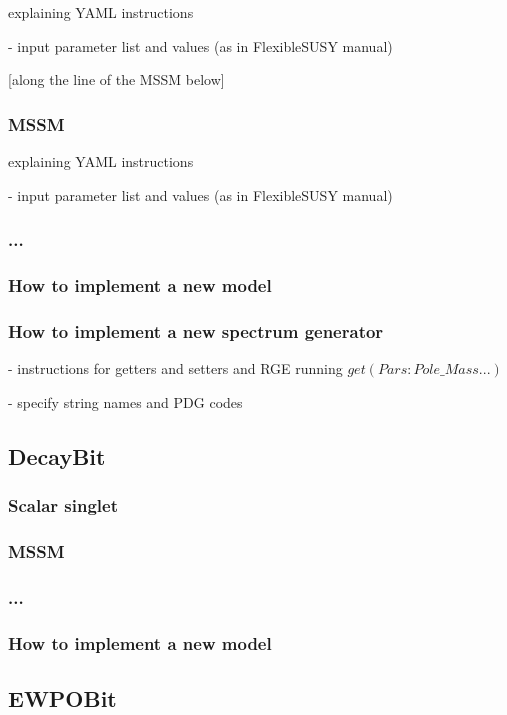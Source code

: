 \documentclass[11pt,a4paper]{article}
\begin{document}
explaining YAML instructions 

- input parameter list and values (as in FlexibleSUSY manual)

[along the line of the MSSM below]

\subsubsection{MSSM}

explaining YAML instructions 

- input parameter list and values (as in FlexibleSUSY manual)

\subsubsection{...}

\subsubsection{How to implement a new model}

\subsubsection{How to implement a new spectrum generator}

- instructions for getters and setters and RGE running
$get(Pars:Pole\_Mass...)$

- specify string names and PDG codes


\subsection{DecayBit}
\subsubsection{Scalar singlet}
\subsubsection{MSSM}
\subsubsection{...}
\subsubsection{How to implement a new model}

\subsection{EWPOBit}
\end{document}
